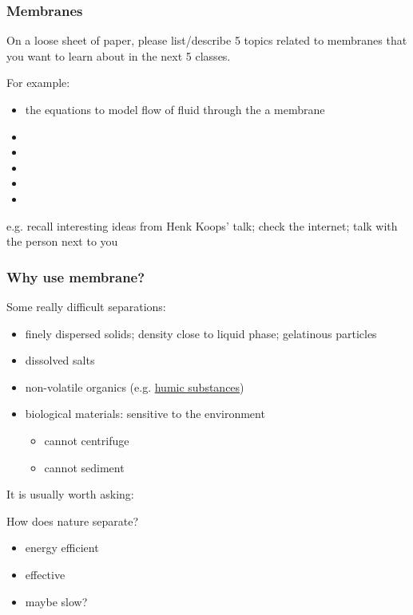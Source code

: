 \begin{frame}\frametitle{Membranes}
	On a loose sheet of paper, please list/describe 5 topics related to membranes that you want to learn about in the next 5 classes.
	
	\vspace{12pt}
	For example:
	\begin{itemize}
		\item	the equations to model flow of fluid through the a membrane
		\item	
		\item	
		\item	
		\item	
		\item	
	\end{itemize}
	
	\vspace{12pt}
	e.g. recall interesting ideas from Henk Koops' talk; check the internet; talk with the person next to you
\end{frame}

\begin{frame}\frametitle{Why use membrane?}
	Some really difficult separations:
	\begin{itemize}
		\item	finely dispersed solids; density close to liquid phase; gelatinous particles
		\item	dissolved salts
		\item	non-volatile organics (e.g. \href{http://en.wikipedia.org/wiki/Humic_acid}{humic substances})
		\item	biological materials: sensitive to the environment
			\begin{itemize}
				\item	cannot centrifuge 
				\item	cannot sediment
			\end{itemize}
	\end{itemize}
	
	\vspace{12pt}
	\begin{exampleblock}{It is usually worth asking:}
		\begin{center}
			How does nature separate?
		\end{center}
		\scriptsize
		\begin{itemize}
			\item	energy efficient
			\item	effective
			\item	maybe slow?
		\end{itemize}
	\end{exampleblock}	
\end{frame}

